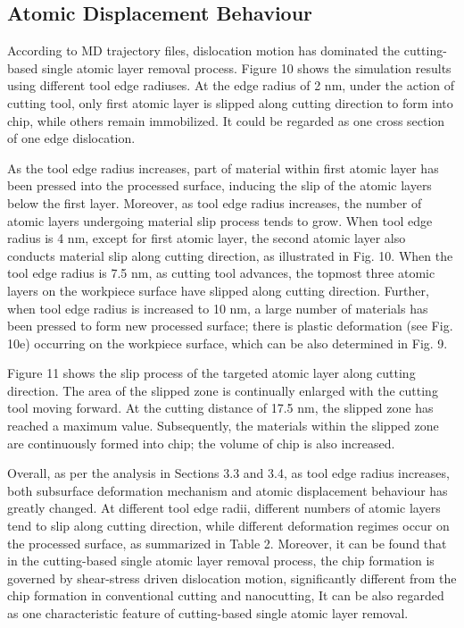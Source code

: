 \documentclass{article}
\begin{document}
\subsection*{Atomic Displacement Behaviour}

According to MD trajectory files, dislocation motion has dominated the cutting-based single atomic layer removal process. Figure 10 shows the simulation results using different tool edge radiuses. At the edge radius of 2 nm, under the action of cutting tool, only first atomic layer is slipped along cutting direction to form into chip, while others remain immobilized. It could be regarded as one cross section of one edge dislocation.

As the tool edge radius increases, part of material within first atomic layer has been pressed into the processed surface, inducing the slip of the atomic layers below the first layer. Moreover, as tool edge radius increases, the number of atomic layers undergoing material slip process tends to grow. When tool edge radius is 4 nm, except for first atomic layer, the second atomic layer also conducts material slip along cutting direction, as illustrated in Fig. 10. When the tool edge radius is 7.5 nm, as cutting tool advances, the topmost three atomic layers on the workpiece surface have slipped along cutting direction. Further, when tool edge radius is increased to 10 nm, a large number of materials has been pressed to form new processed surface; there is plastic deformation (see Fig. 10e) occurring on the workpiece surface, which can be also determined in Fig. 9.

Figure 11 shows the slip process of the targeted atomic layer along cutting direction. The area of the slipped zone is continually enlarged with the cutting tool moving forward. At the cutting distance of 17.5 nm, the slipped zone has reached a maximum value. Subsequently, the materials within the slipped zone are continuously formed into chip; the volume of chip is also increased.

Overall, as per the analysis in Sections 3.3 and 3.4, as tool edge radius increases, both subsurface deformation mechanism and atomic displacement behaviour has greatly changed. At different tool edge radii, different numbers of atomic layers tend to slip along cutting direction, while different deformation regimes occur on the processed surface, as summarized in Table 2. Moreover, it can be found that in the cutting-based single atomic layer removal process, the chip formation is governed by shear-stress driven dislocation motion, significantly different from the chip formation in conventional cutting and nanocutting, It can be also regarded as one characteristic feature of cutting-based single atomic layer removal.
\end{document}
